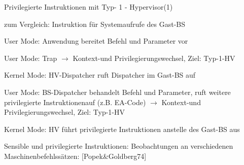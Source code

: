 \documentclass[a4paper]{article}
\begin{document}
\begin{multicols}{3}
    \begin{itemize*}
        \item
    \end{itemize*}

    Privilegierte Instruktionen mit Typ- 1 - Hypervisor(1)

    \begin{itemize*}
        \item
        zum Vergleich: Instruktion für Systemaufrufe des Gast-BS
    \end{itemize*}

    \begin{enumerate*}
        \item
        User Mode: Anwendung bereitet Befehl und Parameter vor
        \item
        User Mode: Trap $\rightarrow$  Kontext-und
        Privilegierungswechsel, Ziel: Typ-1-HV
        \item
        Kernel Mode: HV-Dispatcher ruft Dispatcher im Gast-BS auf
        \item
        User Mode: BS-Dispatcher behandelt Befehl und Parameter, ruft weitere
        privilegierte Instruktionenauf (z.B. EA-Code)
        $\rightarrow$  Kontext-und Privilegierungswechsel,
        Ziel: Typ-1-HV
        \item
        Kernel Mode: HV führt privilegierte Instruktionen anstelle des Gast-BS
        aus
    \end{enumerate*}

    \begin{itemize*}
        \item
    \end{itemize*}

    Sensible und privilegierte Instruktionen: Beobachtungen an verschiedenen
    Maschinenbefehlssätzen: {[}Popek\&Goldberg74{]}


\end{multicols}
\end{document}

